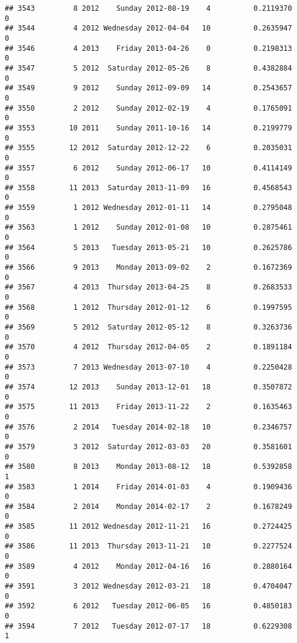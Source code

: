 \documentclass[
]{article}
\begin{document}
\begin{verbatim}
## 3543         8 2012    Sunday 2012-08-19    4          0.2119370             0
## 3544         4 2012 Wednesday 2012-04-04   10          0.2635947             0
## 3546         4 2013    Friday 2013-04-26    0          0.2198313             0
## 3547         5 2012  Saturday 2012-05-26    8          0.4382884             0
## 3549         9 2012    Sunday 2012-09-09   14          0.2543657             0
## 3550         2 2012    Sunday 2012-02-19    4          0.1765091             0
## 3553        10 2011    Sunday 2011-10-16   14          0.2199779             0
## 3555        12 2012  Saturday 2012-12-22    6          0.2035031             0
## 3557         6 2012    Sunday 2012-06-17   10          0.4114149             0
## 3558        11 2013  Saturday 2013-11-09   16          0.4568543             0
## 3559         1 2012 Wednesday 2012-01-11   14          0.2795048             0
## 3563         1 2012    Sunday 2012-01-08   10          0.2875461             0
## 3564         5 2013   Tuesday 2013-05-21   10          0.2625786             0
## 3566         9 2013    Monday 2013-09-02    2          0.1672369             0
## 3567         4 2013  Thursday 2013-04-25    8          0.2683533             0
## 3568         1 2012  Thursday 2012-01-12    6          0.1997595             0
## 3569         5 2012  Saturday 2012-05-12    8          0.3263736             0
## 3570         4 2012  Thursday 2012-04-05    2          0.1891184             0
## 3573         7 2013 Wednesday 2013-07-10    4          0.2250428             0
## 3574        12 2013    Sunday 2013-12-01   18          0.3507872             0
## 3575        11 2013    Friday 2013-11-22    2          0.1635463             0
## 3576         2 2014   Tuesday 2014-02-18   10          0.2346757             0
## 3579         3 2012  Saturday 2012-03-03   20          0.3581601             0
## 3580         8 2013    Monday 2013-08-12   18          0.5392858             1
## 3583         1 2014    Friday 2014-01-03    4          0.1909436             0
## 3584         2 2014    Monday 2014-02-17    2          0.1678249             0
## 3585        11 2012 Wednesday 2012-11-21   16          0.2724425             0
## 3586        11 2013  Thursday 2013-11-21   10          0.2277524             0
## 3589         4 2012    Monday 2012-04-16   16          0.2880164             0
## 3591         3 2012 Wednesday 2012-03-21   18          0.4704047             0
## 3592         6 2012   Tuesday 2012-06-05   16          0.4850183             0
## 3594         7 2012   Tuesday 2012-07-17   18          0.6229308             1

\end{verbatim}
\end{document}
